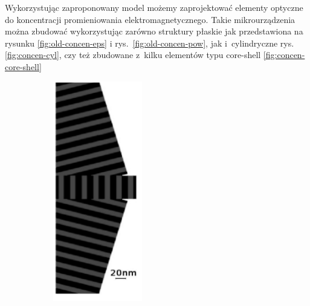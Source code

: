 Wykorzystując zaproponowany model możemy zaprojektować elementy optyczne do koncentracji promieniowania elektromagnetycznego. Takie mikrourządzenia można zbudować wykorzystując zarówno struktury płaskie jak przedstawiona na rysunku \ref{fig:old-concen-eps} i rys.~\ref{fig:old-concen-pow}, jak i~cylindryczne rys.\ref{fig:concen-cyl}, czy też zbudowane z~kilku elementów typu core-shell \ref{fig:concen-core-shell}
\begin{figure}[!htb]
	\centering
	\begin{subfigure}[b]{.45\textwidth}
		\includegraphics[angle=90,width=\textwidth]{images/multilayer/konc_eps_mgr.png}

\end{subfigure}
\end{figure}
